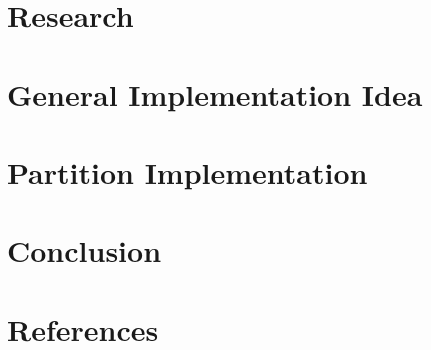 \documentclass{article} %
\begin{document}
\clearpage
{{\section{Research}\label{sect:research}}}




\clearpage
{{\section{General Implementation Idea}\label{sect:generalImpl}}}


\clearpage
{{\section{Partition Implementation}\label{sect:implementation}}}



\clearpage
{{\section{Conclusion}\label{sect:conclusion}}}


\clearpage
{{\section{References}\label{sect:biblio}}}

\end{document}
